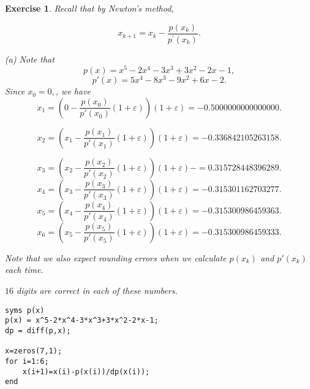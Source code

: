 \documentclass[paper=a4, fontsize=11pt]{scrartcl} %
\numberwithin{equation}{section} %
\numberwithin{figure}{section} %
\numberwithin{table}{section} %
\newtheorem{exercise}{Exercise}
\numberwithin{exercise}{section}
\begin{document}
\begin{exercise}
Recall that by Newton's method,

$$x_{k+1}=x_{k}-\frac{p(x_k)}{p^{\prime} (x_k)}.$$

(a) 
Note that $$p(x)=x^5-2x^4-3x^3+3x^2-2x-1,$$ 
$$p'(x)=5x^4-8x^3-9x^2+6x-2.$$
Since $x_0=0,$, we have 
$$x_1=(0-\frac{p(x_0)}{p'(x_0)}(1+\varepsilon))(1+\varepsilon)=-0.5000000000000000.$$

$$x_2=(x_1-\frac{p(x_1)}{p'(x_1)}(1+\varepsilon))(1+\varepsilon)= -0.336842105263158.$$

$$x_3=(x_2-\frac{p(x_2)}{p'(x_2)}(1+\varepsilon))(1+\varepsilon)-=0.315728448396289.$$
$$x_4=(x_3-\frac{p(x_3)}{p'(x_3)}(1+\varepsilon))(1+\varepsilon)= -0.315301162703277.$$
$$x_5=(x_4-\frac{p(x_4)}{p'(x_4)}(1+\varepsilon))(1+\varepsilon)= -0.315300986459363.$$
$$x_6=(x_5-\frac{p(x_5)}{p'(x_5)}(1+\varepsilon))(1+\varepsilon)=  -0.315300986459333.$$

Note that we also expect rounding errors when we calculate $p(x_k)$ and $p'(x_k)$ each time. 

$16$ digits are correct in each of these numbers.



\begin{verbatim}
syms p(x)
p(x) = x^5-2*x^4-3*x^3+3*x^2-2*x-1;
dp = diff(p,x);

x=zeros(7,1);
for i=1:6;
    x(i+1)=x(i)-p(x(i))/dp(x(i));
end
\end{verbatim}
\end{exercise}
\end{document}
